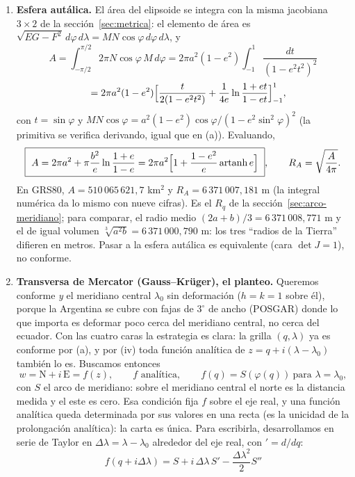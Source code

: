 \begin{enumerate}[label=(\alph*)]
  \(y=S(\varphi)\), el arco de meridiano de la sección~\ref{sec:arco-meridiano}. Ni
  conforme ni equivalente: \(\sigma_1=k\), \(\sigma_2=1\).
  \item \textbf{Esfera autálica.} El área del elipsoide se integra con la misma jacobiana
  \(3\times2\) de la sección~\ref{sec:metrica}: el elemento de área es
  \(\sqrt{EG-F^2}\,d\varphi\,d\lambda=MN\cos\varphi\,d\varphi\,d\lambda\), y
  \[
    A=\int_{-\pi/2}^{\pi/2}2\pi N\cos\varphi\,M\,d\varphi
    =2\pi a^2(1-e^2)\int_{-1}^{1}\frac{dt}{(1-e^2t^2)^2}
  \]
  \[
    \phantom{A}=2\pi a^2(1-e^2)\Bigl[\frac{t}{2(1-e^2t^2)}+\frac1{4e}\ln\frac{1+et}{1-et}\Bigr]_{-1}^{1},
  \]
  con \(t=\sin\varphi\) y \(MN\cos\varphi=a^2(1-e^2)\cos\varphi/(1-e^2\sin^2\varphi)^2\)
  (la primitiva se verifica derivando, igual que en (a)). Evaluando,
  \[
    \boxed{\ A=2\pi a^2+\pi\frac{b^2}{e}\ln\frac{1+e}{1-e}
    =2\pi a^2\Bigl[1+\frac{1-e^2}{e}\operatorname{artanh}e\Bigr]\ },
    \qquad R_A=\sqrt{\frac{A}{4\pi}} .
  \]
  En GRS80, \(A=510\,065\,621{,}7\) km\(^2\) y \(R_A=6\,371\,007{,}181\) m (la integral
  numérica da lo mismo con nueve cifras). Es el \(R_q\) de la sección~\ref{sec:arco-meridiano};
  para comparar, el radio medio \((2a+b)/3=6\,371\,008{,}771\) m y el de igual volumen
  \(\sqrt[3]{a^2b}=6\,371\,000{,}790\) m: los tres ``radios de la Tierra'' difieren en
  metros. Pasar a la esfera autálica es equivalente (cara \(\det J=1\)), no conforme.
  \item \textbf{Transversa de Mercator (Gauss--Krüger), el planteo.} Queremos conforme
  \emph{y} el meridiano central \(\lambda_0\) sin deformación (\(h=k=1\) sobre él), porque
  la Argentina se cubre con fajas de \(3^\circ\) de ancho (POSGAR) donde lo que importa es
  deformar poco cerca del meridiano central, no cerca del ecuador. Con las cuatro caras la
  estrategia es clara: la grilla \((q,\lambda)\) ya es conforme por (a), y por (iv) toda
  función analítica de \(z=q+i(\lambda-\lambda_0)\) también lo es. Buscamos entonces
  \[
    w=\mathrm N+i\,\mathrm E=f(z),\qquad f \text{ analítica},\qquad
    f(q)=S(\varphi(q))\ \text{para } \lambda=\lambda_0 ,
  \]
  con \(S\) el arco de meridiano: sobre el meridiano central el norte es la distancia
  medida y el este es cero. Esa condición fija \(f\) sobre el eje real, y una función
  analítica queda determinada por sus valores en una recta (es la unicidad de la
  prolongación analítica): la carta es única. Para escribirla, desarrollamos en serie de
  Taylor en \(\Delta\lambda=\lambda-\lambda_0\) alrededor del eje real, con
  \('=d/dq\):
  \[
    f(q+i\Delta\lambda)=S+i\,\Delta\lambda\,S'-\frac{\Delta\lambda^2}2S''
\]
\end{enumerate}
